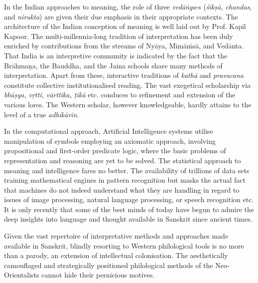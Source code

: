 In the Indian approaches to meaning, the role of three \textit{vedāṅga}-s (\textit{śikṣā, chandas}, and \textit{nirukta}) are given their due emphasis in their appropriate contexts. The architecture of the Indian conception of meaning is well laid out by Prof. Kapil Kapoor. The multi-millennia-long tradition of interpretation has been duly enriched by contributions from the streams of Nyāya, Mīmāṁsā, and Vedānta. That India is an interpretive community is indicated by the fact that the Brāhmaṇa, the Bauddha, and the Jaina schools share many methods of interpretation. Apart from these, interactive traditions of \textit{kathā} and \textit{pravacana} constitute collective institutionalised reading. The vast exegetical scholarship via \textit{bhāṣya, vṛtti, vārttika, ṭīkā} etc. conduces to refinement and extension of the various lores. The Western scholar, however knowledgeable, hardly attains to the level of a true \textit{adhikārin}.

In the computational approach, Artificial Intelligence systems utilise manipulation of symbols employing an axiomatic approach, involving propositional and first-order predicate logic, where the basic problems of representation and reasoning are yet to be solved. The statistical approach to meaning and intelligence fares no better. The availability of trillions of data sets training mathematical engines in pattern recognition but masks the actual fact that machines do not indeed understand what they are handling in regard to issues of image processing, natural language processing, or speech recognition etc. It is only recently that some of the best minds of today have begun to admire the deep insights into language and thought available in Sanskrit since ancient times.

\vskip 2pt

Given the vast repertoire of interpretative methods and approaches made available in Sanskrit, blindly resorting to Western philological tools is no more than a parody, an extension of intellectual colonisation. The aesthetically camouflaged and strategically positioned philological methods of the Neo-Orientalists cannot hide their pernicious motives.

\vskip 2pt

